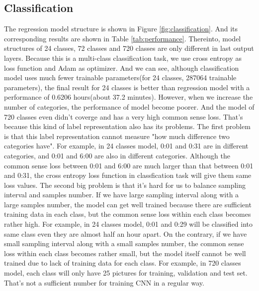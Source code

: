 \documentclass{article}
\begin{document}
\subsection{Classification}
The regression model structure is shown in Figure \ref{fig:classification}. And its corresponding results are shown in Table \ref{tab:performance}. Thereinto, model structures of 24 classes, 72 classes and 720 classes are only different in last output layers. Because this is a multi-class classification task, we use cross entropy as loss function and Adam as optimizer. And we can see, although classification model uses much fewer trainable parameters(for 24 classes, 287064 trainable parameters), the final result for 24 classes is better than regression model with a performance of 0.6206 hours(about 37.2 minutes). However, when we increase the number of categories, the performance of model become poorer. And the model of 720 classes even didn't coverge and has a very high common sense loss. That's because this kind of label representation also has its problems. The first problem is that this label representation cannot measure "how much difference two categories have". For example, in 24 classes model, 0:01 and 0:31 are in different categories, and 0:01 and 6:00 are also in different categories. Although the common sense loss between 0:01 and 6:00 are much larger than that between 0:01 and 0:31, the cross entropy loss function in classfication task will give them same loss values. The second big problem is that it's hard for us to balance  sampling interval and samples number. If we have large sampling interval along with a large samples number, the model can get well trained because there are sufficient training data in each class, but the common sense loss within each class becomes rather high. For example, in 24 classes model, 0:01 and 0:29 will be classified into same class even they are almost half an hour apart. On the contrary, if we have small sampling interval along with a small samples number, the common sense loss within each class becomes rather small, but the model itself cannot be well trained due to lack of training data for each class. For example, in 720 classes model, each class will only have 25 pictures for training, validation and test set. That's not a sufficient number for training CNN in a regular way.
\end{document}
